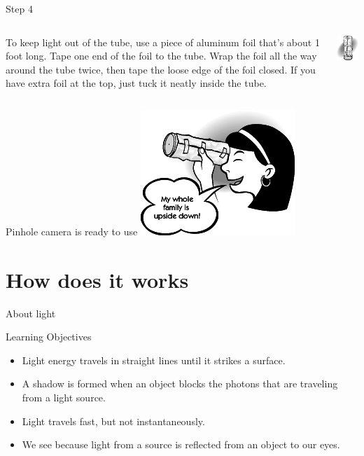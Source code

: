 \begin{frame}{Step 4}
  \begin{columns}
    \begin{column}{0.6\textwidth}
To keep light out of the tube, use a piece of aluminum foil that's about 1 foot long. Tape one end of the foil to the tube. Wrap the foil all the way around the tube twice, then tape the loose edge of the foil closed. If you have extra foil at the top, just tuck it neatly inside the tube.
    \end{column}
    \begin{column}{0.4\textwidth}
      \includegraphics{media/can_cover.png}
    \end{column}
  \end{columns}
\end{frame}

\begin{frame}{Pinhole camera is ready to use}
  \centering
  \includegraphics{media/girl_looks.png}
\end{frame}

\section{How does it works}
\begin{frame}{About light}

Learning Objectives

\begin{itemize}
  \item 
    Light energy travels in straight lines until it strikes a surface.
  \item 
    A shadow is formed when an object blocks the photons that are traveling from a light source.
  \item 
    Light travels fast, but not instantaneously.
  \item 
    We see because light from a source is reflected from an object to our eyes.
\end{itemize}
\end{frame}

